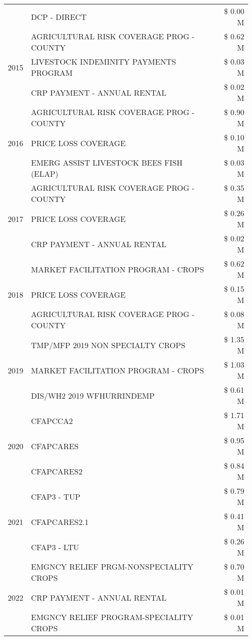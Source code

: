 \begin{tabular}{llr}
 & DCP - DIRECT & \$ 0.00 M \\
\cline{1-3}
\multirow[t]{3}{*}{2015} & AGRICULTURAL RISK COVERAGE PROG - COUNTY & \$ 0.62 M \\
 & LIVESTOCK INDEMINITY PAYMENTS PROGRAM & \$ 0.03 M \\
 & CRP PAYMENT - ANNUAL RENTAL & \$ 0.02 M \\
\cline{1-3}
\multirow[t]{3}{*}{2016} & AGRICULTURAL RISK COVERAGE PROG - COUNTY & \$ 0.90 M \\
 & PRICE LOSS COVERAGE & \$ 0.10 M \\
 & EMERG ASSIST LIVESTOCK BEES FISH (ELAP) & \$ 0.03 M \\
\cline{1-3}
\multirow[t]{3}{*}{2017} & AGRICULTURAL RISK COVERAGE PROG - COUNTY & \$ 0.35 M \\
 & PRICE LOSS COVERAGE & \$ 0.26 M \\
 & CRP PAYMENT - ANNUAL RENTAL & \$ 0.02 M \\
\cline{1-3}
\multirow[t]{3}{*}{2018} & MARKET FACILITATION PROGRAM - CROPS & \$ 0.62 M \\
 & PRICE LOSS COVERAGE & \$ 0.15 M \\
 & AGRICULTURAL RISK COVERAGE PROG - COUNTY & \$ 0.08 M \\
\cline{1-3}
\multirow[t]{3}{*}{2019} & TMP/MFP 2019 NON SPECIALTY CROPS & \$ 1.35 M \\
 & MARKET FACILITATION PROGRAM - CROPS & \$ 1.03 M \\
 & DIS/WH2 2019 WFHURRINDEMP & \$ 0.61 M \\
\cline{1-3}
\multirow[t]{3}{*}{2020} & CFAPCCA2 & \$ 1.71 M \\
 & CFAPCARES & \$ 0.95 M \\
 & CFAPCARES2 & \$ 0.84 M \\
\cline{1-3}
\multirow[t]{3}{*}{2021} & CFAP3 - TUP & \$ 0.79 M \\
 & CFAPCARES2.1 & \$ 0.41 M \\
 & CFAP3 - LTU & \$ 0.26 M \\
\cline{1-3}
\multirow[t]{3}{*}{2022} & EMGNCY RELIEF PRGM-NONSPECIALITY CROPS & \$ 0.70 M \\
 & CRP PAYMENT - ANNUAL RENTAL & \$ 0.01 M \\
 & EMGNCY RELIEF PROGRAM-SPECIALITY CROPS & \$ 0.01 M \\
\cline{1-3}
\bottomrule
\end{tabular}
